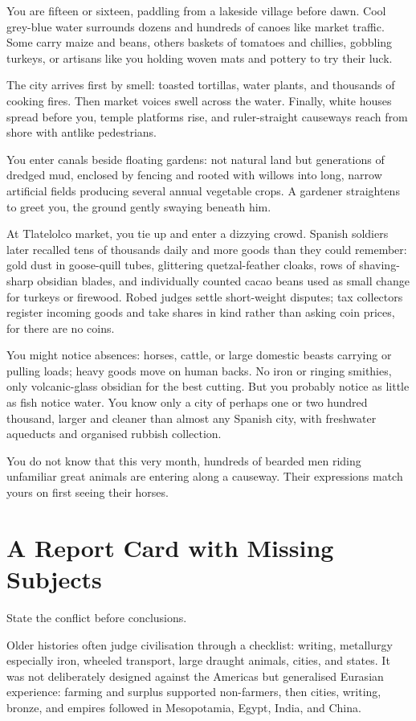 You are fifteen or sixteen, paddling from a lakeside village before dawn. Cool grey-blue water surrounds dozens and hundreds of canoes like market traffic. Some carry maize and beans, others baskets of tomatoes and chillies, gobbling turkeys, or artisans like you holding woven mats and pottery to try their luck.

The city arrives first by smell: toasted tortillas, water plants, and thousands of cooking fires. Then market voices swell across the water. Finally, white houses spread before you, temple platforms rise, and ruler-straight causeways reach from shore with antlike pedestrians.

You enter canals beside floating gardens: not natural land but generations of dredged mud, enclosed by fencing and rooted with willows into long, narrow artificial fields producing several annual vegetable crops. A gardener straightens to greet you, the ground gently swaying beneath him.

At Tlatelolco market, you tie up and enter a dizzying crowd. Spanish soldiers later recalled tens of thousands daily and more goods than they could remember: gold dust in goose-quill tubes, glittering quetzal-feather cloaks, rows of shaving-sharp obsidian blades, and individually counted cacao beans used as small change for turkeys or firewood. Robed judges settle short-weight disputes; tax collectors register incoming goods and take shares in kind rather than asking coin prices, for there are no coins.

You might notice absences: horses, cattle, or large domestic beasts carrying or pulling loads; heavy goods move on human backs. No iron or ringing smithies, only volcanic-glass obsidian for the best cutting. But you probably notice as little as fish notice water. You know only a city of perhaps one or two hundred thousand, larger and cleaner than almost any Spanish city, with freshwater aqueducts and organised rubbish collection.

You do not know that this very month, hundreds of bearded men riding unfamiliar great animals are entering along a causeway. Their expressions match yours on first seeing their horses.

\section{A Report Card with Missing Subjects}
State the conflict before conclusions.

Older histories often judge civilisation through a checklist: writing, metallurgy especially iron, wheeled transport, large draught animals, cities, and states. It was not deliberately designed against the Americas but generalised Eurasian experience: farming and surplus supported non-farmers, then cities, writing, bronze, and empires followed in Mesopotamia, Egypt, India, and China.

